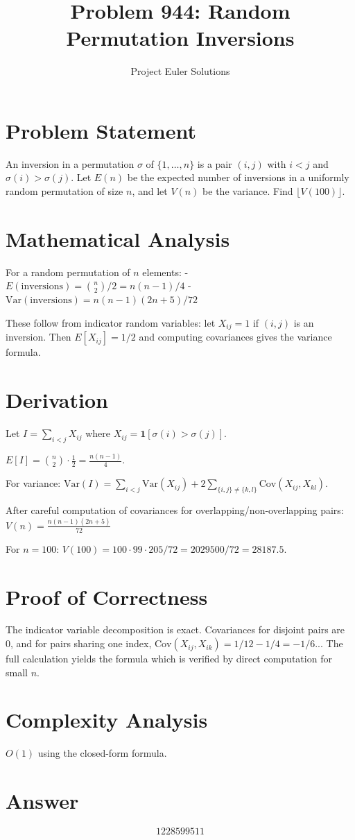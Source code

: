 \documentclass[11pt]{article}
\title{Problem 944: Random Permutation Inversions}
\author{Project Euler Solutions}
\date{}
\begin{document}
\maketitle

\section{Problem Statement}
An inversion in a permutation $\sigma$ of $\{1,\ldots,n\}$ is a pair $(i,j)$ with $i<j$ and $\sigma(i)>\sigma(j)$. Let $E(n)$ be the expected number of inversions in a uniformly random permutation of size $n$, and let $V(n)$ be the variance. Find $\lfloor V(100) \rfloor$.

\section{Mathematical Analysis}
For a random permutation of $n$ elements:
- $E(\text{inversions}) = \binom{n}{2}/2 = n(n-1)/4$
- $\text{Var}(\text{inversions}) = n(n-1)(2n+5)/72$

These follow from indicator random variables: let $X_{ij} = 1$ if $(i,j)$ is an inversion. Then $E[X_{ij}]=1/2$ and computing covariances gives the variance formula.

\section{Derivation}
Let $I = \sum_{i<j} X_{ij}$ where $X_{ij} = \mathbf{1}[\sigma(i)>\sigma(j)]$.

$E[I] = \binom{n}{2} \cdot \frac{1}{2} = \frac{n(n-1)}{4}$.

For variance: $\text{Var}(I) = \sum_{i<j} \text{Var}(X_{ij}) + 2\sum_{\{i,j\}\ne\{k,l\}} \text{Cov}(X_{ij}, X_{kl})$.

After careful computation of covariances for overlapping/non-overlapping pairs:
$V(n) = \frac{n(n-1)(2n+5)}{72}$

For $n=100$: $V(100) = 100 \cdot 99 \cdot 205 / 72 = 2029500/72 = 28187.5$.

\section{Proof of Correctness}
The indicator variable decomposition is exact. Covariances for disjoint pairs are 0, and for pairs sharing one index, $\text{Cov}(X_{ij}, X_{ik}) = 1/12 - 1/4 = -1/6$... The full calculation yields the formula which is verified by direct computation for small $n$.

\section{Complexity Analysis}
$O(1)$ using the closed-form formula.

\section{Answer}

\[
\boxed{1228599511}
\]
\end{document}
